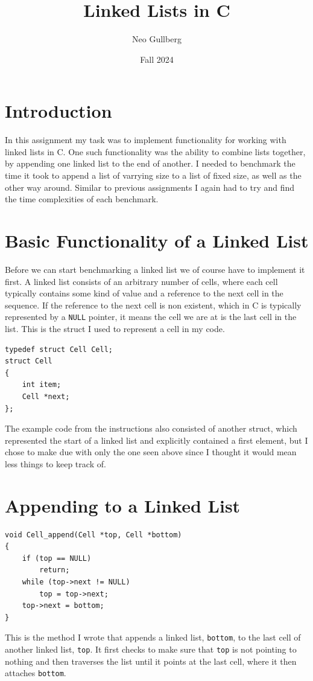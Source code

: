 \documentclass[a4paper, 11pt]{article}
\begin{document}
\title{
	\textbf{Linked Lists in C}
}
\author{Neo Gullberg}
\date{Fall 2024}
\maketitle

\section{Introduction}
	In this assignment my task was to implement functionality for working with linked lists in C.
	One such functionality was the ability to combine lists together, by appending one linked list to the end of another.
	I needed to benchmark the time it took to append a list of varrying size to a list of fixed size,
	as well as the other way around.
	Similar to previous assignments I again had to try and find the time complexities of each benchmark.

\section{Basic Functionality of a Linked List}
	Before we can start benchmarking a linked list we of course have to implement it first.
	A linked list consists of an arbitrary number of cells, where each cell typically contains some kind of value and a reference to the next cell in the sequence.
	If the reference to the next cell is non existent, which in C is typically represented by a \texttt{NULL} pointer, it means the cell we are at is the last cell in the list.
	This is the struct I used to represent a cell in my code.
	\begin{verbatim}
typedef struct Cell Cell;
struct Cell
{
	int item;
	Cell *next;
};
	\end{verbatim}
	The example code from the instructions also consisted of another struct, which represented the start of a linked list and explicitly contained a first element,
	but I chose to make due with only the one seen above since I thought it would mean less things to keep track of.

\section{Appending to a Linked List}
	\begin{verbatim}
void Cell_append(Cell *top, Cell *bottom)
{
	if (top == NULL)
		return;
	while (top->next != NULL)
		top = top->next;
	top->next = bottom;
}
	\end{verbatim}
	This is the method I wrote that appends a linked list, \texttt{bottom}, to the last cell of another linked list, \texttt{top}.
	It first checks to make sure that \texttt{top} is not pointing to nothing and then traverses the list until it points at the last cell, where it then attaches \texttt{bottom}.
\end{document}
